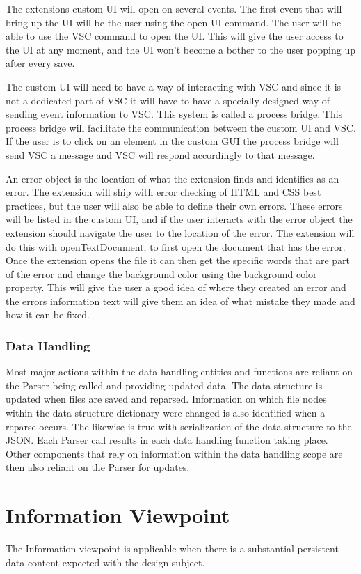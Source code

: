 \documentclass[letterpaper,10pt,titlepage,draftclsnofoot,onecolumn,onesided] {IEEEtran}
\begin{document}
The extensions custom UI will open on several events. 
The first event that will bring up the UI will be the user using the open UI command. 
The user will be able to use the VSC command to open the UI. 
This will give the user access to the UI at any moment, and the UI won't become a bother to the user popping up after every save. 

The custom UI will need to have a way of interacting with VSC and since it is not a dedicated part of VSC it will have to have a specially designed way of sending event information to VSC. 
This system is called a process bridge. 
This process bridge will facilitate the communication between the custom UI and VSC.
If the user is to click on an element in the custom GUI the process bridge will send VSC a message and VSC will respond accordingly to that message. 

An error object is the location of what the extension finds and identifies as an error.
The extension will ship with error checking of HTML and CSS best practices, but the user will also be able to define their own errors. 
These errors will be listed in the custom UI, and if the user interacts with the error object the extension should navigate the user to the location of the error.
The extension will do this with openTextDocument, to first open the document that has the error. 
Once the extension opens the file it can then get the specific words that are part of the error and change the background color using the background color property. \cite{VSCodeDocumentation}
This will give the user a good idea of where they created an error and the errors information text will give them an idea of what mistake they made and how it can be fixed.

\subsubsection{Data Handling}
Most major actions within the data handling entities and functions are reliant on the Parser being called and providing updated data.
The data structure is updated when files are saved and reparsed. 
Information on which file nodes within the data structure dictionary were changed is also identified when a reparse occurs.
The likewise is true with serialization of the data structure to the JSON.
Each Parser call results in each data handling function taking place. 
Other components that rely on information within the data handling scope are then also reliant on the Parser for updates.
	
\section{Information Viewpoint}
The Information viewpoint is applicable when there is a substantial persistent data content expected with
the design subject. 
\end{document}
